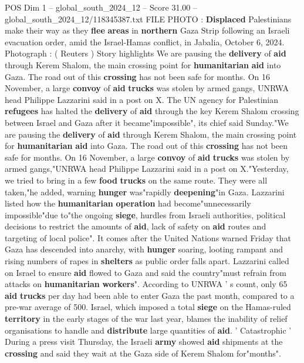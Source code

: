 \begin{textsample}{POS Dim 1 – global\_south\_2024\_12 – Score 31.00 – global\_south\_2024\_12/118345387.txt}  \label{ex:f1_pos_109}
FILE PHOTO : \textbf{Displaced} Palestinians make their way as they \textbf{flee} \textbf{areas} in \textbf{northern} Gaza Strip following an Israeli evacuation order, amid the Israel-Hamas conflict, in Jabalia, October 6, 2024.
Photograph : ( Reuters ) Story highlights We are pausing the \textbf{delivery} of \textbf{aid} through Kerem Shalom, the main crossing point for \textbf{humanitarian} \textbf{aid} into Gaza.
The road out of this \textbf{crossing} has not been safe for months.
On 16 November, a large \textbf{convoy} of \textbf{aid} \textbf{trucks} was stolen by armed gangs, UNRWA head Philippe Lazzarini said in a post on X.
The UN agency for Palestinian \textbf{refugees} has halted the \textbf{delivery} of \textbf{aid} through the key Kerem Shalom crossing between Israel and Gaza after it became"impossible", its chief said Sunday."We are pausing the \textbf{delivery} of \textbf{aid} through Kerem Shalom, the main crossing point for \textbf{humanitarian} \textbf{aid} into Gaza.
The road out of this \textbf{crossing} has not been safe for months.
On 16 November, a large \textbf{convoy} of \textbf{aid} \textbf{trucks} was stolen by armed gangs,"UNRWA head Philippe Lazzarini said in a post on X."Yesterday, we tried to bring in a few \textbf{food} \textbf{trucks} on the same route.
They were all taken,"he added, warning \textbf{hunger} was"rapidly \textbf{deepening}"in Gaza.
Lazzarini listed how the \textbf{humanitarian} \textbf{operation} had become"unnecessarily impossible"due to"the ongoing \textbf{siege}, hurdles from Israeli authorities, political decisions to restrict the amounts of \textbf{aid}, lack of safety on \textbf{aid} routes and targeting of local police".
It comes after the United Nations warned Friday that Gaza has descended into anarchy, with \textbf{hunger} soaring, looting rampant and rising numbers of rapes in \textbf{shelters} as public order falls apart.
Lazzarini called on Israel to ensure \textbf{aid} flowed to Gaza and said the country"must refrain from attacks on \textbf{humanitarian} \textbf{workers}".
According to UNRWA ' s count, only 65 \textbf{aid} \textbf{trucks} per day had been able to enter Gaza the past month, compared to a pre-war average of 500.
Israel, which imposed a total \textbf{siege} on the Hamas-ruled \textbf{territory} in the early stages of the war last year, blames the inability of relief organisations to handle and \textbf{distribute} large quantities of \textbf{aid}. ' Catastrophic ' During a press visit Thursday, the Israeli \textbf{army} showed \textbf{aid} shipments at the \textbf{crossing} and said they wait at the Gaza side of Kerem Shalom for"months".

\end{textsample}
